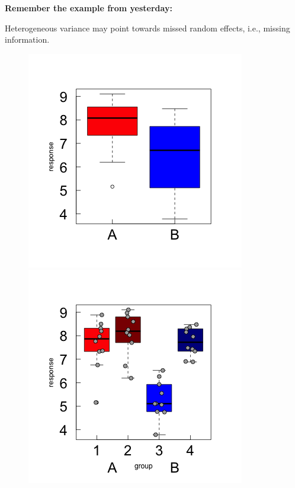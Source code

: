 \documentclass{beamer}
\begin{document}
\begin{frame}
    \frametitle{}
    \textbf{Remember the example from yesterday:}
    
    Heterogeneous variance may point towards missed random effects, i.e., missing information.

    \begin{figure}
        \centering
        \includegraphics[width=0.4\linewidth]{lectures/day_2_LM_refresh_I/figures/unnamed-chunk-43-1.png}
        \includegraphics[width=0.4\linewidth]{lectures/day_2_LM_refresh_I/figures/unnamed-chunk-44-1.png}
    \end{figure}
\end{frame}
\end{document}
